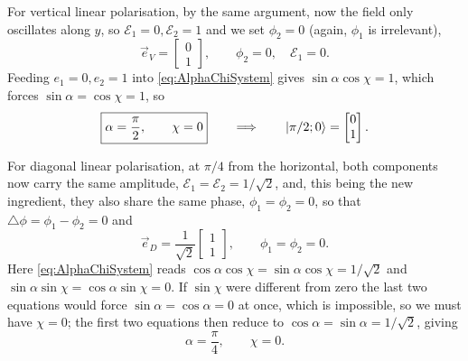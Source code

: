             For vertical linear polarisation, by the same argument, now the field only oscillates along $y$, so $\mathcal{E}_1=0,\mathcal{E}_2=1$ and we set $\phi_2=0$ (again, $\phi_1$ is irrelevant),
            \begin{equation}\label{eq:JonesVert}
                \vec{e}_V = \begin{bmatrix}0\\1\end{bmatrix}, \qquad \phi_2=0,\quad \mathcal{E}_1=0.
            \end{equation}
            Feeding $e_1=0,e_2=1$ into \ref{eq:AlphaChiSystem} gives $\sin\alpha\cos\chi=1$, which forces $\sin\alpha=\cos\chi=1$, so
            \begin{equation}\label{eq:VertAngles}
                \boxed{\alpha=\frac{\pi}{2},\qquad \chi=0} \qquad\Longrightarrow\qquad \ket{\pi/2;0}=\begin{bmatrix}0\\1\end{bmatrix}.
            \end{equation}

            For diagonal linear polarisation, at $\pi/4$ from the horizontal, both components now carry the same amplitude, $\mathcal{E}_1=\mathcal{E}_2=1/\sqrt{2}$, and, this being the new ingredient, they also share the same phase, $\phi_1=\phi_2=0$, so that $\triangle\phi=\phi_1-\phi_2=0$ and
            \begin{equation}\label{eq:JonesDiag}
                \vec{e}_{D} = \frac{1}{\sqrt{2}}\begin{bmatrix}1\\1\end{bmatrix}, \qquad \phi_1=\phi_2=0.
            \end{equation}
            Here \ref{eq:AlphaChiSystem} reads $\cos\alpha\cos\chi=\sin\alpha\cos\chi=1/\sqrt2$ and $\sin\alpha\sin\chi=\cos\alpha\sin\chi=0$. If $\sin\chi$ were different from zero the last two equations would force $\sin\alpha=\cos\alpha=0$ at once, which is impossible, so we must have $\chi=0$; the first two equations then reduce to $\cos\alpha=\sin\alpha=1/\sqrt2$, giving
            \begin{equation}\label{eq:DiagAngles}
                \boxed{\alpha=\frac{\pi}{4},\qquad \chi=0}.
            \end{equation}

